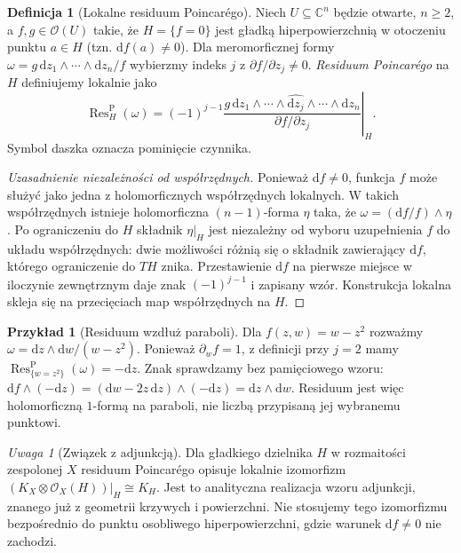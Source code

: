 \documentclass[11pt,a4paper,openany]{report}
\numberwithin{equation}{section}
\theoremstyle{plain}
\theoremstyle{definition}
\newtheorem{definicja}[twierdzenie]{Definicja}
\newtheorem{przyklad}[twierdzenie]{Przykład}
\theoremstyle{remark}
\newtheorem{uwaga}[twierdzenie]{Uwaga}
\newcommand{\C}{\mathbb C}
\begin{document}
\begin{definicja}[Lokalne residuum Poincarégo]
\label{def:ga4-poincare-res}
Niech $U\subseteq\C^n$ będzie otwarte, $n\ge2$, a
$f,g\in\mathcal O(U)$ takie, że $H=\{f=0\}$ jest
gładką hiperpowierzchnią w otoczeniu punktu $a\in H$
(tzn. $\mathrm df(a)\ne0$). Dla meromorficznej formy
$\omega=g\,\mathrm dz_1\wedge\cdots\wedge\mathrm dz_n/f$
wybierzmy indeks $j$ z $\partial f/\partial z_j\ne0$.
\emph{Residuum Poincarégo} na $H$ definiujemy lokalnie jako
\[
\operatorname{Res}_H^{\mathrm P}(\omega)
=\left.(-1)^{j-1}\frac{g\,\mathrm dz_1\wedge\cdots
\wedge\widehat{\mathrm dz_j}\wedge\cdots\wedge\mathrm dz_n}
{\partial f/\partial z_j}\right|_H.
\]
Symbol daszka oznacza pominięcie czynnika.
\end{definicja}
\begin{proof}[Uzasadnienie niezależności od współrzędnych]
Ponieważ $\mathrm df\ne0$, funkcja $f$ może służyć
jako jedna z holomorficznych współrzędnych lokalnych.
W takich współrzędnych istnieje holomorficzna $(n-1)$-forma
$\eta$ taka, że $\omega=(\mathrm df/f)\wedge\eta$.
Po ograniczeniu do $H$ składnik $\eta|_H$ jest
niezależny od wyboru uzupełnienia $f$ do układu
współrzędnych: dwie możliwości różnią się o składnik
zawierający $\mathrm df$, którego ograniczenie do $TH$
znika. Przestawienie $\mathrm df$ na pierwsze miejsce
w iloczynie zewnętrznym daje znak $(-1)^{j-1}$
i zapisany wzór. Konstrukcja lokalna skleja się na
przecięciach map współrzędnych na $H$.
\end{proof}

\begin{przyklad}[Residuum wzdłuż paraboli]
Dla $f(z,w)=w-z^2$ rozważmy
$\omega=\mathrm dz\wedge\mathrm dw/(w-z^2)$.
Ponieważ $\partial_w f=1$, z definicji przy $j=2$ mamy
$\operatorname{Res}^{\mathrm P}_{\{w=z^2\}}(\omega)=-\mathrm dz$.
Znak sprawdzamy bez pamięciowego wzoru:
$\mathrm df\wedge(-\mathrm dz)
=(\mathrm dw-2z\,\mathrm dz)\wedge(-\mathrm dz)
=\mathrm dz\wedge\mathrm dw$.
Residuum jest więc holomorficzną $1$-formą na paraboli,
nie liczbą przypisaną jej wybranemu punktowi.
\end{przyklad}

\begin{uwaga}[Związek z adjunkcją]
Dla gładkiego dzielnika $H$ w rozmaitości zespolonej $X$
residuum Poincarégo opisuje lokalnie izomorfizm
$(K_X\otimes\mathcal O_X(H))|_H\cong K_H$.
Jest to analityczna realizacja wzoru adjunkcji,
znanego już z geometrii krzywych i powierzchni.
Nie stosujemy tego izomorfizmu bezpośrednio do punktu
osobliwego hiperpowierzchni, gdzie warunek $\mathrm df\ne0$
nie zachodzi.
\end{uwaga}
\end{document}
